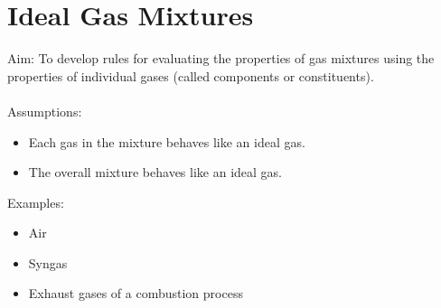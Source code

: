 \section{Ideal Gas Mixtures}
Aim: To develop rules for evaluating the properties of gas mixtures using the properties of individual gases (called components or constituents). \\\\
Assumptions:
\begin{itemize}[noitemsep]
  \item Each gas in the mixture behaves like an ideal gas.
  \item The overall mixture behaves like an ideal gas.
\end{itemize}
Examples:
\begin{itemize}[noitemsep]
  \item Air
  \item Syngas
  \item Exhaust gases of a combustion process
\end{itemize}
